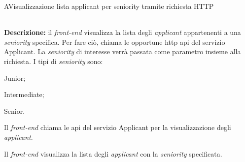 \begin{usecase}{2.2}{A}{Visualizzazione lista applicant per seniority tramite richiesta HTTP}


	\textbf{\\Descrizione:} il \textit{front-end} visualizza la lista degli \textit{applicant} appartenenti a una \textit{seniority} specifica. Per fare ciò, chiama le opportune \acrshort{http} \acrshort{api} del servizio Applicant. La \textit{seniority} di interesse verrà passata come parametro insieme alla richiesta.
	I tipi di \textit{seniority} sono:
	\begin{ucitemize}
		\item Junior;
		\item Intermediate;
		\item Senior.
	\end{ucitemize}

	\begin{ucscenarioprincipale}
		\item Il \textit{front-end} chiama le \acrshort{api} del servizio Applicant per la visualizzazione degli \textit{applicant}.
		\item Il \textit{front-end} visualizza la lista degli \textit{applicant} con la \textit{seniority} specificata.
	\end{ucscenarioprincipale}


	\label{uc:vis-lista-applicant-seniority-http-a}
\end{usecase}

